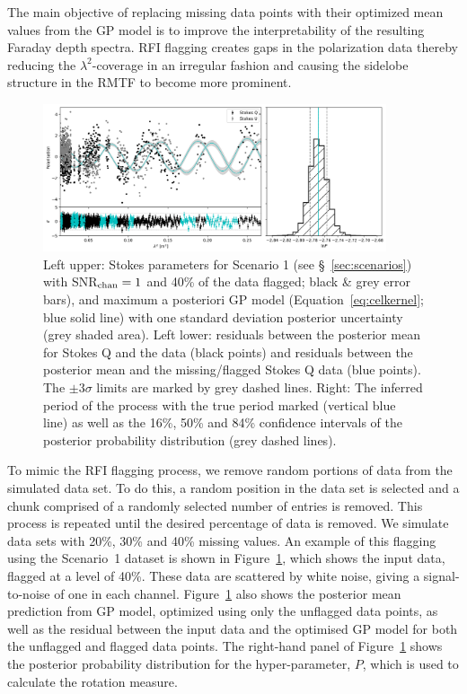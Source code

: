 \documentclass[fleqn,usenatbib]{mnras}
\begin{document}
The main objective of replacing missing data points with their optimized mean values from the GP model is to improve the interpretability of the resulting Faraday depth spectra. RFI flagging creates gaps in the polarization data thereby reducing the $\lambda^{2}$-coverage in an irregular fashion and causing the sidelobe structure in the RMTF to become more prominent.
%
\begin{figure}
\includegraphics[width=0.9\textwidth]{./FIGURES/diff_case1_minus40_n1.png}
\caption{\label{fig:scenario1} Left upper: Stokes parameters for Scenario 1 (see \S~\ref{sec:scenarios}) with SNR$_{\rm chan}=1$ and 40\% of the data flagged; black \& grey error bars), and maximum a posteriori GP model (Equation~\ref{eq:celkernel}; blue solid line) with one standard deviation posterior uncertainty (grey shaded area). Left lower: residuals between the posterior mean for Stokes Q and the data (black points) and residuals between the posterior mean and the missing/flagged Stokes Q data (blue points). The $\pm3\sigma$ limits are marked by grey dashed lines. Right: The inferred period of the process with the true period marked (vertical blue line) as well as the 16\%, 50\% and 84\% confidence intervals of the posterior probability distribution (grey dashed lines).}
\end{figure}

To mimic the RFI flagging process, we remove random portions of data from the simulated data set. To do this, a random position in the data set is selected and a chunk comprised of a randomly selected number of entries is removed. This process is repeated until the desired percentage of data is removed. We simulate data sets with 20\%, 30\% and 40\% missing values. An example of this flagging using the Scenario~1 dataset is shown in Figure~\ref{fig:scenario1}, which shows the input data, flagged at a level of 40\%. These data are scattered by white noise, giving a signal-to-noise of one in each channel. Figure~\ref{fig:scenario1} also shows the posterior mean prediction from GP model, optimized using only the unflagged data points, as well as the residual between the input data and the optimised GP model for both the unflagged and flagged data points. The right-hand panel of Figure~\ref{fig:scenario1} shows the posterior probability distribution for the hyper-parameter, $P$, which is used to calculate the rotation measure.
\end{document}
